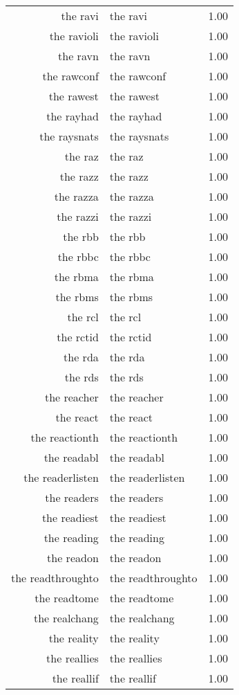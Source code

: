 \begin{table}[ht]
\begin{tabular}{rlr}
  the ravi & the ravi & 1.00 \\ 
  the ravioli & the ravioli & 1.00 \\ 
  the ravn & the ravn & 1.00 \\ 
  the rawconf & the rawconf & 1.00 \\ 
  the rawest & the rawest & 1.00 \\ 
  the rayhad & the rayhad & 1.00 \\ 
  the raysnats & the raysnats & 1.00 \\ 
  the raz & the raz & 1.00 \\ 
  the razz & the razz & 1.00 \\ 
  the razza & the razza & 1.00 \\ 
  the razzi & the razzi & 1.00 \\ 
  the rbb & the rbb & 1.00 \\ 
  the rbbc & the rbbc & 1.00 \\ 
  the rbma & the rbma & 1.00 \\ 
  the rbms & the rbms & 1.00 \\ 
  the rcl & the rcl & 1.00 \\ 
  the rctid & the rctid & 1.00 \\ 
  the rda & the rda & 1.00 \\ 
  the rds & the rds & 1.00 \\ 
  the reacher & the reacher & 1.00 \\ 
  the react & the react & 1.00 \\ 
  the reactionth & the reactionth & 1.00 \\ 
  the readabl & the readabl & 1.00 \\ 
  the readerlisten & the readerlisten & 1.00 \\ 
  the readers & the readers & 1.00 \\ 
  the readiest & the readiest & 1.00 \\ 
  the reading & the reading & 1.00 \\ 
  the readon & the readon & 1.00 \\ 
  the readthroughto & the readthroughto & 1.00 \\ 
  the readtome & the readtome & 1.00 \\ 
  the realchang & the realchang & 1.00 \\ 
  the reality & the reality & 1.00 \\ 
  the reallies & the reallies & 1.00 \\ 
  the reallif & the reallif & 1.00 \\ 

\end{tabular}
\end{table}
